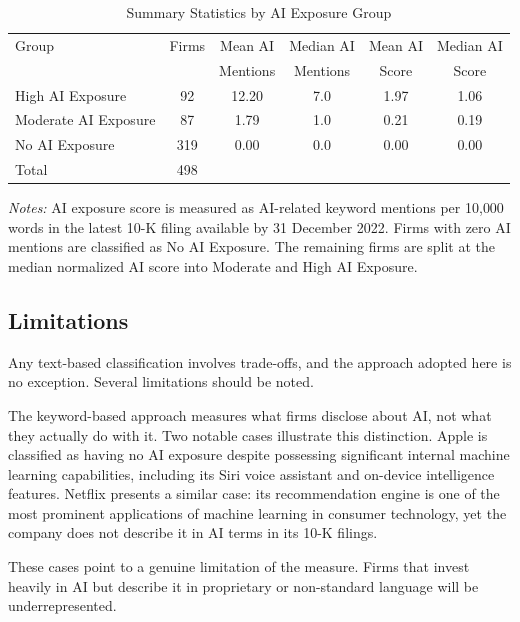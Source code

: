 \documentclass[12pt,a4paper]{article}
\begin{document}
\begin{table}[H]
\centering
\caption{Summary Statistics by AI Exposure Group}
\small
\setlength{\tabcolsep}{4pt}
\begin{tabular}{lccccc}
\toprule
Group & Firms & Mean AI & Median AI & Mean AI & Median AI \\
      &       & Mentions & Mentions & Score & Score \\
\midrule
High AI Exposure     & 92  & 12.20 & 7.0 & 1.97 & 1.06 \\
Moderate AI Exposure & 87  & 1.79  & 1.0 & 0.21 & 0.19 \\
No AI Exposure       & 319 & 0.00  & 0.0 & 0.00 & 0.00 \\
\midrule
Total                & 498 &      &     &      &      \\
\bottomrule
\end{tabular}
\vspace{0.4em}
\begin{minipage}{0.95\linewidth}
\footnotesize
\textit{Notes:} AI exposure score is measured as AI-related keyword mentions per 10{,}000 words in the latest 10-K filing available by 31 December 2022. Firms with zero AI mentions are classified as No AI Exposure. The remaining firms are split at the median normalized AI score into Moderate and High AI Exposure.
\end{minipage}

\end{table}

\subsection{Limitations}

Any text-based classification involves trade-offs, and the approach adopted here is no exception. Several limitations should be noted.

The keyword-based approach measures what firms disclose about AI, not what they actually do with it. Two notable cases illustrate this distinction. Apple is classified as having no AI exposure despite possessing significant internal machine learning capabilities, including its Siri voice assistant and on-device intelligence features. Netflix presents a similar case: its recommendation engine is one of the most prominent applications of machine learning in consumer technology, yet the company does not describe it in AI terms in its 10-K filings.

These cases point to a genuine limitation of the measure. Firms that invest heavily in AI but describe it in proprietary or non-standard language will be underrepresented. 
\end{document}

